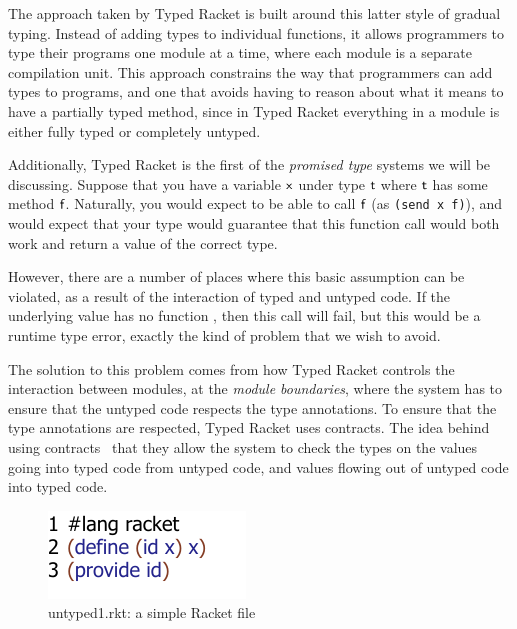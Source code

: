 \documentclass[a4paper,USenglish]{tex/lipics-v2016}
\begin{document}
The approach taken by Typed Racket is built around this latter style of
gradual typing.  Instead of adding types to individual functions, it allows
programmers to type their programs one module at a time, where each module
is a separate compilation unit.  This approach constrains the way that
programmers can add types to programs, and one that avoids having to reason
about what it means to have a partially typed method, since in Typed Racket
everything in a module is either fully typed or completely untyped.

Additionally, Typed Racket is the first of the \emph{promised type} systems
we will be discussing. Suppose that you have a variable ${\sf{x}}$ under type $\t$
where $\t$ has some method ${\sf{f}}$. Naturally, you would expect to be able
to call ${\sf{f}}$ (as \verb|(send x f)|), and would expect that your type
would guarantee that this function call would both work and return a value
of the correct type.

However, there are a number of places where this basic assumption can be
violated, as a result of the interaction of typed and untyped code. If the
underlying value has no function , then this call will fail, but this
would be a runtime type error, exactly the kind of problem that we wish to
avoid.

The solution to this problem comes from how Typed Racket controls the
interaction between modules, at the \emph{module boundaries}, where the
system has to ensure that the untyped code respects the type annotations. To
ensure that the type annotations are respected, Typed Racket uses
contracts. The idea behind using contracts~\cite{ff-icfp02} that they allow
the system to check the types on the values going into typed code from
untyped code, and values flowing out of untyped code into typed code.

\begin{figure}[h]
\includegraphics{figures/untyped-rkt1.pdf}
\caption{untyped1.rkt: a simple Racket file}
\label{fig:ut1r}
\end{figure}
\end{document}
